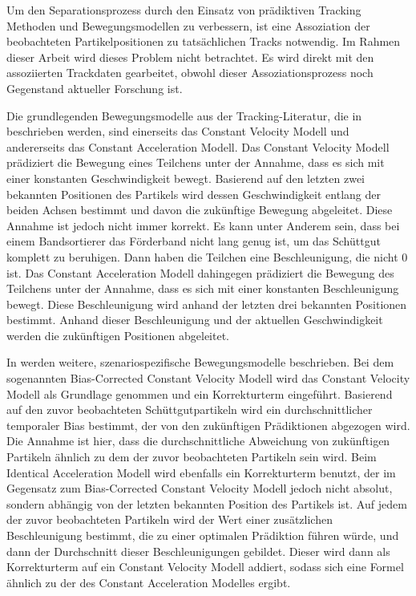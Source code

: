Um den Separationsprozess durch den Einsatz von prädiktiven Tracking Methoden und Bewegungsmodellen zu verbessern, ist eine Assoziation 
der beobachteten Partikelpositionen zu tatsächlichen Tracks notwendig. 
Im Rahmen dieser Arbeit wird dieses Problem nicht betrachtet. 
Es wird direkt mit den assoziierten Trackdaten gearbeitet, 
obwohl dieser Assoziationsprozess noch Gegenstand aktueller Forschung ist.

Die grundlegenden Bewegungsmodelle aus der Tracking-Literatur, die in \cite{Pfaff2018} beschrieben werden,
sind einerseits das Constant Velocity Modell und andererseits das Constant Acceleration Modell.
Das Constant Velocity Modell prädiziert die Bewegung eines Teilchens unter der Annahme, dass es sich mit einer konstanten Geschwindigkeit bewegt.
Basierend auf den letzten zwei bekannten Positionen des Partikels wird dessen Geschwindigkeit entlang der beiden Achsen bestimmt 
und davon die zukünftige Bewegung abgeleitet.
Diese Annahme ist jedoch nicht immer korrekt.
Es kann unter Anderem sein, dass bei einem Bandsortierer das Förderband nicht lang genug ist, um das Schüttgut komplett zu beruhigen.
Dann haben die Teilchen eine Beschleunigung, die nicht 0 ist.
Das Constant Acceleration Modell dahingegen prädiziert die Bewegung des Teilchens unter der Annahme, dass es sich mit einer konstanten Beschleunigung bewegt.
Diese Beschleunigung wird anhand der letzten drei bekannten Positionen bestimmt.
Anhand dieser Beschleunigung und der aktuellen Geschwindigkeit werden die zukünftigen Positionen abgeleitet.

In \cite{Pfaff2018} werden weitere, szenariospezifische Bewegungsmodelle beschrieben.
Bei dem sogenannten Bias-Corrected Constant Velocity Modell wird das Constant Velocity Modell als Grundlage genommen und ein Korrekturterm eingeführt.
Basierend auf den zuvor beobachteten Schüttgutpartikeln wird ein durchschnittlicher temporaler Bias bestimmt, der von den zukünftigen Prädiktionen abgezogen wird.
Die Annahme ist hier, dass die durchschnittliche Abweichung von zukünftigen Partikeln ähnlich zu dem der zuvor beobachteten Partikeln sein wird.
Beim Identical Acceleration Modell wird ebenfalls ein Korrekturterm benutzt, 
der im Gegensatz zum Bias-Corrected Constant Velocity Modell jedoch nicht absolut, sondern abhängig von der letzten bekannten Position des Partikels ist.
Auf jedem der zuvor beobachteten Partikeln wird der Wert einer zusätzlichen Beschleunigung bestimmt, die zu einer optimalen Prädiktion führen würde,
und dann der Durchschnitt dieser Beschleunigungen gebildet.
Dieser wird dann als Korrekturterm auf ein Constant Velocity Modell addiert, sodass sich eine Formel ähnlich zu der des Constant Acceleration Modelles ergibt.

